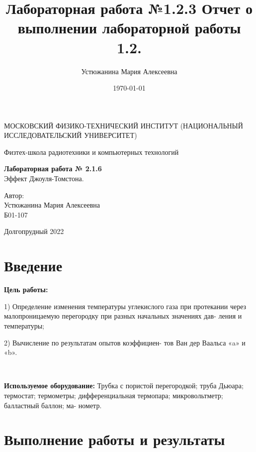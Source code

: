 \documentclass[a4paper,12pt]{article} %
\author{Устюжанина Мария Алексеевна}
\title{Лабораторная работа №1.2.3
Отчет о выполнении лабораторной работы 1.2.
}
\date{\today}
\begin{document}
\begin{titlepage}
	\begin{center}
		{\large МОСКОВСКИЙ ФИЗИКО-ТЕХНИЧЕСКИЙ ИНСТИТУТ (НАЦИОНАЛЬНЫЙ ИССЛЕДОВАТЕЛЬСКИЙ УНИВЕРСИТЕТ)}
	\end{center}
	\begin{center}
		{\large Физтех-школа радиотехники и компьютерных технологий}
	\end{center}
	
	
	\vspace{4.5cm}
	{\huge
		\begin{center}
			{\bf Лабораторная работа № 2.1.6}\\
			 Эффект Джоуля-Томстона.
		\end{center}
	}
	\vspace{4cm}
	\begin{flushright}
		{\LARGE Автор:\\ Устюжанина Мария Алексеевна \\
			\vspace{0.3cm}
			Б01-107}
	\end{flushright}
	\vspace{6cm}
	\begin{center}
		Долгопрудный 2022
	\end{center}
\end{titlepage}

\section{Введение}

\textbf{Цель работы:}

1) Определение изменения температуры углекислого газа при протекании через малопроницаемую перегородку при разных начальных значениях дав- ления и температуры; 

2) Вычисление по результатам опытов коэффициен- тов Ван дер Ваальса «a» и «b».

\

\textbf{Используемое оборудование:}
Трубка с пористой перегородкой; труба Дьюара; термостат; термометры; дифференциальная термопара; микровольтметр; балластный баллон; ма- нометр.

\section{Выполнение работы и результаты}
\end{document}
